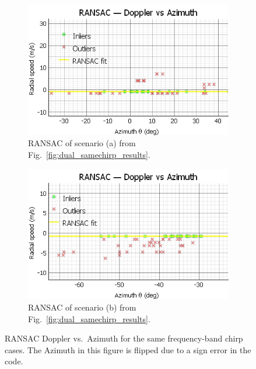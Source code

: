 \begin{figure}[!htbp]
    \centering
    \begin{subfigure}{0.48\linewidth}
        \includegraphics[width=\linewidth]{images/DualSensorSameConfigRansac.png}
        \caption{RANSAC of scenario (a) from Fig.~\ref{fig:dual_samechirp_results}.}
        \label{fig:dual_samechirp_ransac_vehicle}
    \end{subfigure}
    \hfill
    \begin{subfigure}{0.48\linewidth}
        \includegraphics[width=\linewidth]{images/DualSensorSameConfigPersonRansac.png}
        \caption{RANSAC of scenario (b) from Fig.~\ref{fig:dual_samechirp_results}.}
        \label{fig:dual_samechirp_ransac_person}
    \end{subfigure}
    \caption{RANSAC Doppler vs.\ Azimuth for the same frequency-band chirp cases. The Azimuth in this figure is flipped due to a sign error in the code. }
    \label{fig:dual_samechirp_ransac}
\end{figure}

